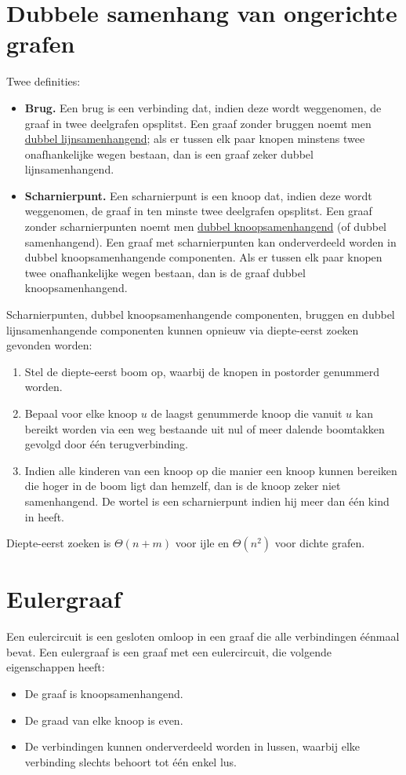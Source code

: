 \documentclass{report}
\begin{document}
\section{Dubbele samenhang van ongerichte grafen}
Twee definities:
\begin{itemize}
	\item[\info] \textbf{Brug.} Een brug is een verbinding dat, indien deze wordt weggenomen, de graaf in twee deelgrafen opsplitst. Een graaf zonder bruggen noemt men \underline{dubbel lijnsamenhangend}; als er tussen elk paar knopen minstens twee onafhankelijke wegen bestaan, dan is een graaf zeker dubbel lijnsamenhangend.
	\item[\info] \textbf{Scharnierpunt.} Een scharnierpunt is een knoop dat, indien deze wordt weggenomen, de graaf in ten minste twee deelgrafen opsplitst. Een graaf zonder scharnierpunten noemt men \underline{dubbel knoopsamenhangend} (of dubbel samenhangend). Een graaf met scharnierpunten kan onderverdeeld worden in dubbel knoopsamenhangende componenten. Als er tussen elk paar knopen twee onafhankelijke wegen bestaan, dan is de graaf dubbel knoopsamenhangend.
\end{itemize}

Scharnierpunten, dubbel knoopsamenhangende componenten, bruggen en dubbel lijnsamenhangende componenten kunnen opnieuw via diepte-eerst zoeken gevonden worden:
\begin{enumerate}
	\item Stel de diepte-eerst boom op, waarbij de knopen in postorder genummerd worden. 
	\item Bepaal voor elke knoop $u$ de laagst genummerde knoop die vanuit $u$ kan bereikt worden via een weg bestaande uit nul of meer dalende boomtakken gevolgd door één terugverbinding. 
	\item Indien alle kinderen van een knoop op die manier een knoop kunnen bereiken die hoger in de boom ligt dan hemzelf, dan is de knoop zeker niet samenhangend. De wortel is een scharnierpunt indien hij meer dan één kind in heeft. 
\end{enumerate}
Diepte-eerst zoeken is $\Theta(n + m)$ voor ijle en $\Theta(n^2)$ voor dichte grafen.
\section{Eulergraaf}
Een eulercircuit is een gesloten omloop in een graaf die alle verbindingen éénmaal bevat. Een eulergraaf is een graaf met een eulercircuit, die volgende eigenschappen heeft:
\begin{itemize}
	\item De graaf is knoopsamenhangend.
	\item De graad van elke knoop is even.
	\item De verbindingen kunnen onderverdeeld worden in lussen, waarbij elke verbinding slechts behoort tot één enkel lus.
\end{itemize}
\end{document}
